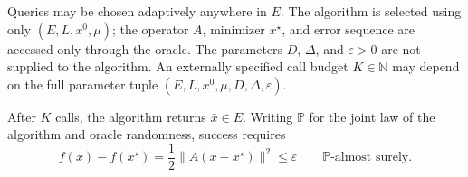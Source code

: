 \documentclass[10pt]{article}
\theoremstyle{definition}
\begin{document}
Queries may be chosen adaptively anywhere in $E$. The algorithm is selected using only $(E,L,x^0,\mu)$; the operator $A$, minimizer $x^\star$, and error sequence are accessed only through the oracle. The parameters $D$, $\Delta$, and $\varepsilon>0$ are not supplied to the algorithm. An externally specified call budget $K\in\mathbb{N}$ may depend on the full parameter tuple $(E,L,x^0,\mu,D,\Delta,\varepsilon)$.

After $K$ calls, the algorithm returns $\bar{x}\in E$. Writing $\mathbb{P}$ for the joint law of the algorithm and oracle randomness, success requires
\[
f(\bar{x})-f(x^\star)
=\frac12\|A(\bar{x}-x^\star)\|^2
\leq\varepsilon
\qquad\mathbb{P}\text{-almost surely}.
\]
\end{document}
